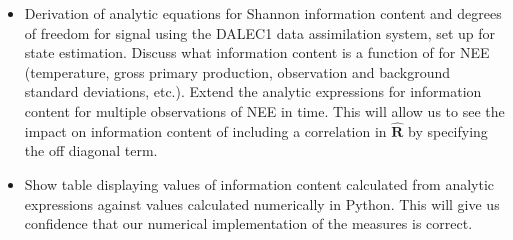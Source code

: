 \documentclass[11pt]{article}
\begin{document}
\begin{itemize}
\item Derivation of analytic equations for Shannon information content and degrees of freedom for signal using the DALEC1 data assimilation system, set up for state estimation. Discuss what information content is a function of for NEE (temperature, gross primary production, observation and background standard deviations, etc.). Extend the analytic expressions for information content for multiple observations of NEE in time. This will allow us to see the impact on information content of including a correlation in $\hat{\textbf{R}}$ by specifying the off diagonal term.

\item Show table displaying values of information content calculated from analytic expressions against values calculated numerically in Python. This will give us confidence that our numerical implementation of the measures is correct.
\end{itemize}
\end{document}
